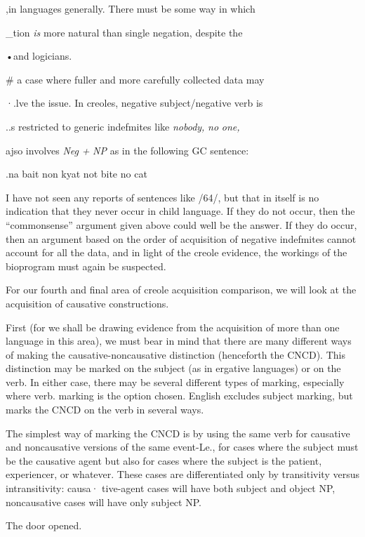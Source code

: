 ,in languages generally. There must be some way in which

\_tion \textit{is} more natural than single negation, despite the

•and logicians.

\# a case where fuller and more carefully collected data may

·.lve the issue. In creoles, negative subject/negative verb is

..s restricted to generic indefmites like \textit{nobody,} \textit{no} \textit{one,}

ajso involves \textit{Neg }\textit{+} \textit{NP }as in the following GC sentence:

.na bait non kyat not bite no cat


I have not seen any reports of sentences like /64/, but that in itself is no indication that they never occur in child language. If they do not occur, then the ``commonsense'' argument given above could well be the answer. If they do occur, then an argument based on the order of acquisition of negative indefmites cannot account for all the data, and in light of the creole evidence, the workings of the bioprogram
must again be suspected.

For our fourth and final area of creole acquisition comparison, we will look at the acquisition of causative constructions.

First (for we shall be drawing evidence from the acquisition of
more than one language in this area), we must bear in mind that there are many different ways of making the causative-noncausative dis\-tinction (henceforth the CNCD). This distinction may be marked on the subject (as in ergative languages) or on the verb. In either case, there may be several different types of marking, especially where verb. marking is the option chosen. English excludes subject marking, but marks the CNCD on the verb in several ways.

The simplest way of marking the CNCD is by using the same
verb for causative and noncausative versions of the same event-Le., for cases where the subject must be the causative agent but also for cases where the subject is the patient, experiencer, or whatever. These cases are differentiated only by transitivity versus intransitivity: causa· tive-agent cases will have both subject and object NP, noncausative
cases will have only subject NP.

\ea\label{ex:65}
 The door opened.
\z

